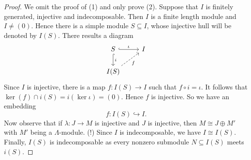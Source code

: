 \begin{proof}
We omit the proof of (1) and only prove (2). Suppose that $I$ is finitely generated, injective and indecomposable. Then $I$ is a finite length module and $I\neq (0)$. Hence there is a simple module $S\subseteq I$, whose injective hull will be denoted by $I(S)$. There results a diagram
%
\[
\begin{tikzcd}
	S \ar[r,hook,"\iota"] \ar[d,hook,"i"] & I \\
	I(S) \ar[ur,dashed,"f"'] &
\end{tikzcd}
\]
%
Since $I$ is injective, there is a map  $f:I(S)\to I$ such that $f\circ i=\iota$. It follows that $\ker(f) \cap i(S)=i(\ker\iota)=(0)$. Hence $f$ is injective. So we have an embedding
\[
f:I(S)\hookrightarrow I.
\]
Now observe that if $\lambda:J\to M$ is injective and $J$ is injective, then $M\cong J\oplus M'$ with $M'$ being a $\Lambda$-module. (!) Since $I$ is indecomposable, we have $I\cong I(S)$. Finally, $I(S)$ is indecomposable as every nonzero submodule $N\subseteq I(S)$ meets $i(S)$.
\end{proof}


